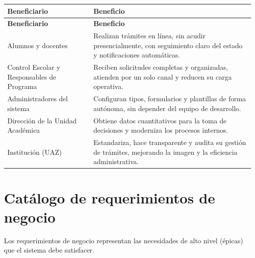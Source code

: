 \documentclass[12pt,letterpaper]{report}
\begin{document}
\begin{longtable}{|L{4cm}|L{9.5cm}|}
    \hline
    \textbf{Beneficiario} & \textbf{Beneficio} \\
    \hline
    \endfirsthead
    \hline
    \textbf{Beneficiario} & \textbf{Beneficio} \\
    \hline
    \endhead
    \hline
    \endfoot

    Alumnos y docentes & Realizan trámites en línea, sin acudir presencialmente, con seguimiento claro del estado y notificaciones automáticas. \\
    \hline
    Control Escolar y Responsables de Programa & Reciben solicitudes completas y organizadas, atienden por un solo canal y reducen su carga operativa. \\
    \hline
    Administradores del sistema & Configuran tipos, formularios y plantillas de forma autónoma, sin depender del equipo de desarrollo. \\
    \hline
    Dirección de la Unidad Académica & Obtiene datos cuantitativos para la toma de decisiones y moderniza los procesos internos. \\
    \hline
    Institución (UAZ) & Estandariza, hace transparente y audita su gestión de trámites, mejorando la imagen y la eficiencia administrativa. \\
    \hline
\end{longtable}

\section{Catálogo de requerimientos de negocio}

Los requerimientos de negocio representan las necesidades de alto nivel (épicas) que el sistema debe satisfacer.
\end{document}
